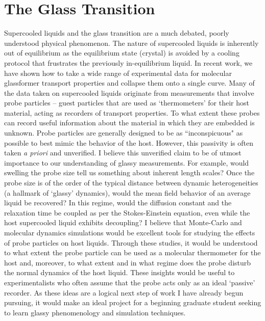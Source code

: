 \documentclass[11pt]{article}
\begin{document}
\section{The Glass Transition}
Supercooled liquids and the glass transition are a much debated, poorly understood physical phenomenon.  The nature of supercooled liquids is inherently out of equilibrium as the equilibrium state (crystal) is avoided by a cooling protocol that frustrates the previously in-equilibrium liquid.  In recent work, we have shown how to take a wide range of experimental data for molecular glassformer transport properties and collapse them onto a single curve. Many of the data taken on supercooled liquids originate from measurements that involve probe particles -- guest particles that are used as `thermometers' for their host material, acting as recorders of transport properties.  To what extent these probes can record useful information about the material in which they are embedded is unknown.  Probe particles are generally designed to be as ``inconspicuous" as possible to best mimic the behavior of the host.  However, this passivity is often taken {\it a priori} and unverified. I believe this unverified claim to be of utmost importance to our understanding of glassy measurements. For example, would swelling the probe size tell us something about inherent length scales?   Once the probe size is of the order of the typical distance between dynamic heterogeneities (a hallmark of `glassy' dynamics), would the mean field behavior of an average liquid be recovered? In this regime, would the diffusion constant and the relaxation time  be coupled as per the Stokes-Einstein equation, even while the host supercooled liquid exhibits decoupling? I believe that Monte-Carlo and molecular dynamics simulations would be excellent tools for studying the effects of probe particles on host liquids.  Through these studies, it would be understood to what extent the probe particle can be used as a molecular thermometer for the host and, moreover, to what extent and in what regime does the probe disturb the normal dynamics of the host liquid.  These insights would be useful to experimentalists who often assume that the probe acts only as an ideal `passive' recorder.  
As these ideas are a logical next step of work I have already begun pursuing, it would make an ideal project for a beginning graduate student seeking to learn glassy phenomenology and simulation techniques.  
\end{document}
